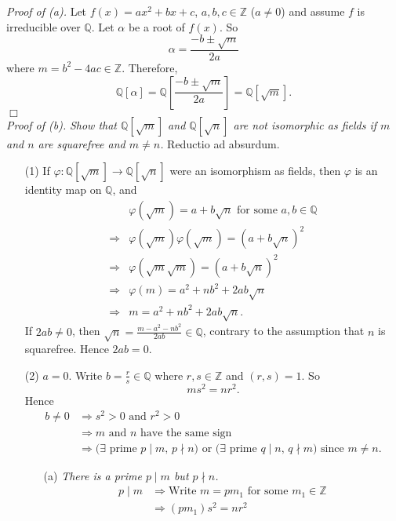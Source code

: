 \documentclass{article}
\begin{document}
\emph{Proof of (a).}
Let $f(x) = ax^2+bx+c$, $a, b, c \in \mathbb{Z}$ ($a \neq 0$)
and assume $f$ is irreducible over $\mathbb{Q}$.
Let $\alpha$ be a root of $f(x)$.
So
$$\alpha = \frac{-b \pm \sqrt{m}}{2a}$$
where $m = b^2-4ac \in \mathbb{Z}$.
Therefore,
$$\mathbb{Q}[\alpha]
= \mathbb{Q}\left[ \frac{-b \pm \sqrt{m}}{2a} \right]
= \mathbb{Q}[\sqrt{m}].$$
$\Box$ \\

\emph{Proof of (b).}
\emph{Show that $\mathbb{Q}[\sqrt{m}]$ and $\mathbb{Q}[\sqrt{n}]$
are not isomorphic as fields if $m$ and $n$ are squarefree and $m \neq n$.}
Reductio ad absurdum.
\begin{enumerate}
\item[(1)]
If $\varphi: \mathbb{Q}[\sqrt{m}] \to \mathbb{Q}[\sqrt{n}]$ were an isomorphism
as fields, then $\varphi$ is an identity map on $\mathbb{Q}$, and
\begin{align*}
&\varphi(\sqrt{m}) = a + b\sqrt{n} \text{ for some } a, b \in \mathbb{Q} \\
\Longrightarrow&
\varphi(\sqrt{m})\varphi(\sqrt{m}) = (a + b\sqrt{n})^2 \\
\Longrightarrow&
\varphi(\sqrt{m} \sqrt{m}) = (a + b\sqrt{n})^2 \\
\Longrightarrow&
\varphi(m) = a^2 + nb^2 + 2ab\sqrt{n} \\
\Longrightarrow&
m = a^2 + nb^2 + 2ab\sqrt{n}.
\end{align*}
If $2ab \neq 0$, then $\sqrt{n} = \frac{m-a^2-nb^2}{2ab} \in \mathbb{Q}$,
contrary to the assumption that $n$ is squarefree.
Hence $2ab = 0$.
\item[(2)]
$a = 0$.
Write $b = \frac{r}{s} \in \mathbb{Q}$ where $r, s \in \mathbb{Z}$ and $(r, s) = 1$.
So $$ms^2 = nr^2.$$
Hence
\begin{align*}
b \neq 0
&\Longrightarrow
s^2 > 0 \text{ and } r^2 > 0 \\
&\Longrightarrow
\text{$m$ and $n$ have the same sign} \\
&\Longrightarrow
\text{($\exists$ prime $p \mid m$, $p \nmid n$) or
($\exists$ prime $q \mid n$, $q \nmid m$) since $m \neq n$}.
\end{align*}
  \begin{enumerate}
  \item[(a)]
  \emph{There is a prime $p \mid m$ but $p \nmid n$.}
  \begin{align*}
  p \mid m
  &\Longrightarrow
  \text{Write $m = pm_1$ for some $m_1 \in \mathbb{Z}$} \\
  &\Longrightarrow
  (pm_1)s^2 = nr^2

\end{align*}
\end{enumerate}
\end{enumerate}
\end{document}
